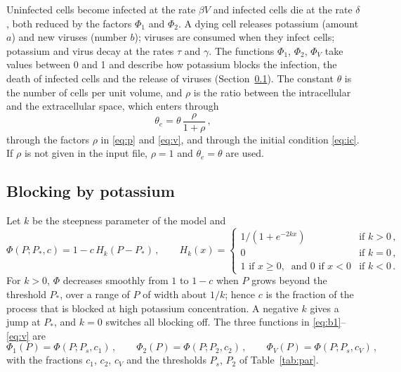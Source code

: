 \documentclass[11pt]{article}
\newcommand{\thetae}{\theta_e}
\begin{document}
Uninfected cells become infected at the rate $\beta V$ and infected cells die at the rate $\delta$, both reduced by the factors $\Phi_1$ and $\Phi_2$.
A dying cell releases potassium (amount $a$) and new viruses (number $b$); viruses are consumed when they infect cells; potassium and virus decay at the rates $\tau$ and $\gamma$.
The functions $\Phi_1$, $\Phi_2$, $\Phi_V$ take values between 0 and 1 and describe how potassium blocks the infection, the death of infected cells and the release of viruses (Section~\ref{sec:block}).
The constant $\theta$ is the number of cells per unit volume, and $\rho$ is the ratio between the intracellular and the extracellular space, which enters through
\begin{equation}
  \thetae = \theta\,\frac{\rho}{1+\rho}\,,
  \label{eq:thetae}
\end{equation}
through the factors $\rho$ in \eqref{eq:p} and \eqref{eq:v}, and through the initial condition \eqref{eq:ic}.
If $\rho$ is not given in the input file, $\rho=1$ and $\thetae=\theta$ are used.

\subsection{Blocking by potassium}
\label{sec:block}
Let $k$ be the steepness parameter of the model and
\begin{equation}
  \Phi(P;P_*,c) = 1 - c\,H_k(P-P_*)\,,\qquad
  H_k(x) =
  \begin{cases}
    1/(1+e^{-2kx}) & \text{if } k>0\,, \\
    0 & \text{if } k=0\,, \\
    1 \text{ if } x\ge0,\ \text{ and } 0 \text{ if } x<0 & \text{if } k<0\,.
  \end{cases}
  \label{eq:phi}
\end{equation}
For $k>0$, $\Phi$ decreases smoothly from $1$ to $1-c$ when $P$ grows beyond the threshold $P_*$, over a range of $P$ of width about $1/k$; hence $c$ is the fraction of the process that is blocked at high potassium concentration.
A negative $k$ gives a jump at $P_*$, and $k=0$ switches all blocking off.
The three functions in \eqref{eq:b1}--\eqref{eq:v} are
\begin{equation*}
  \Phi_1(P) = \Phi(P;P_s,c_1)\,,\qquad
  \Phi_2(P) = \Phi(P;P_2,c_2)\,,\qquad
  \Phi_V(P) = \Phi(P;P_s,c_V)\,,
\end{equation*}
with the fractions $c_1$, $c_2$, $c_V$ and the thresholds $P_s$, $P_2$ of Table~\ref{tab:par}.
\end{document}
